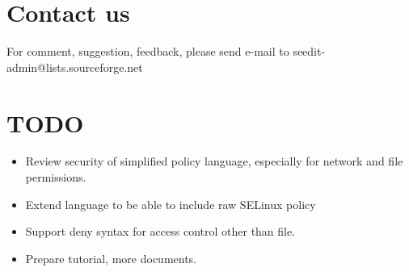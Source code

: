 \section{Contact us}
For comment, suggestion, feedback, please send e-mail to seedit-admin@lists.sourceforge.net

\section{TODO}
\begin{itemize}
 \item Review security of simplified policy language, especially for
       network and file permissions.
 \item Extend language to be able to include raw SELinux policy
 \item Support deny syntax for access control other than file.
 \item Prepare tutorial, more documents.
\end{itemize}

